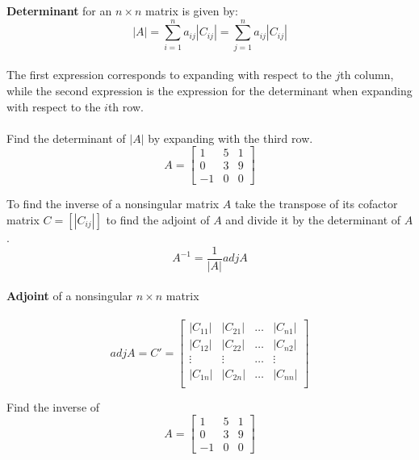 \documentclass{./../../Latex/handout}
\begin{document}
\newpage
\textbf{Determinant} for an  $n \times n$ matrix is given by:
 $$|A| = \sum_{i=1}^n a_{ij} |C_{ij}| = \sum_{j=1}^n a_{ij} |C_{ij}| $$ \\
The first expression corresponds to expanding with respect to the $j$th column, while the second expression is the expression for the determinant when expanding with respect to the $i$th row. \\~\\

Find the determinant of $|A|$ by expanding with the third row.
\[
A=\left[\begin{array}{ccc}
1 & 5 & 1 \\
0 & 3 & 9 \\
-1 & 0 & 0
\end{array}\right]
\]

\newpage 

To find the inverse of a nonsingular matrix $A$ take the transpose of its cofactor matrix $C = [|C_{ij}|]$ to find the adjoint of $A$ and divide it by the determinant of $A$. 
$$ A^{-1} = \frac{1}{|A|} adj A$$ \\

 \textbf{Adjoint} of a nonsingular $n \times n$ matrix \\~\\
 $$adj A = C' = \left[\begin{array}{llll}
|C_{11}| & |C_{21}| & \hdots & |C_{n1}| \\
|C_{12}| & |C_{22}| & \hdots &  |C_{n2}| \\
\vdots &\vdots & \hdots &  \vdots \\
|C_{1n}| & |C_{2n}| & \hdots & |C_{nn}| \\
\end{array}\right]$$
\vspace{1em}

Find the inverse of \[
A=\left[\begin{array}{ccc}
1 & 5 & 1 \\
0 & 3 & 9 \\
-1 & 0 & 0
\end{array}\right]
\]
\end{document}
